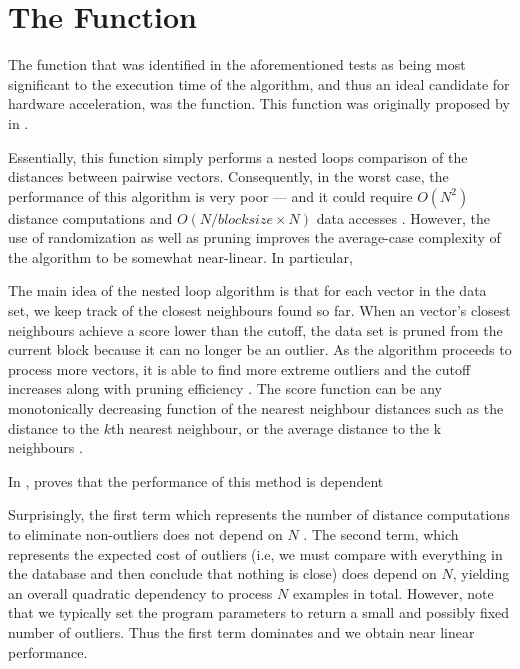 \section{The Function}
\label{profiling:function}
The function that was identified in the aforementioned tests as being most
significant to the execution time of the  algorithm, and thus an ideal candidate for hardware acceleration, was the
 function. This function was originally
proposed by \citeauthor{Bay:2003} in .

Essentially, this function simply performs a nested loops comparison of the
distances between pairwise vectors. Consequently, in the worst case, the
performance of this algorithm is very poor --- and it could require $O(N^2)$
distance computations and $O(N/blocksize \times N)$ data accesses
\cite{Bay:2003}. However, the use of randomization as well as pruning improves
the average-case complexity of the algorithm to be somewhat near-linear. In
particular, \citeauthor{Bay:2003}

The main idea of the nested loop algorithm is that for each vector in the data
set, we keep track of the closest neighbours found so far. When an vector's
closest neighbours achieve a score lower than the cutoff, the data set is pruned
from the current block because it can no longer be an outlier. As the algorithm
proceeds to process more vectors, it is able to find more extreme outliers and
the cutoff increases along with pruning efficiency \cite{Bay:2003}. The score
function can be any monotonically decreasing function of the nearest neighbour
distances such as the distance to the $k$th nearest neighbour, or the average
distance to the k neighbours \cite{Bay:2003}.

In , \citeauthor{Bay:2003} proves that the performance of
this method is dependent

Surprisingly, the first term which represents the number of distance
computations to eliminate non-outliers does not depend on $N$ . The second term,
which represents the expected cost of outliers (i.e, we must compare with
everything in the database and then conclude that nothing is close) does depend
on $N$, yielding an overall quadratic dependency to process $N$ examples in
total. However, note that we typically set the program parameters to return a
small and possibly fixed number of outliers. Thus the first term dominates and
we obtain near linear performance.

